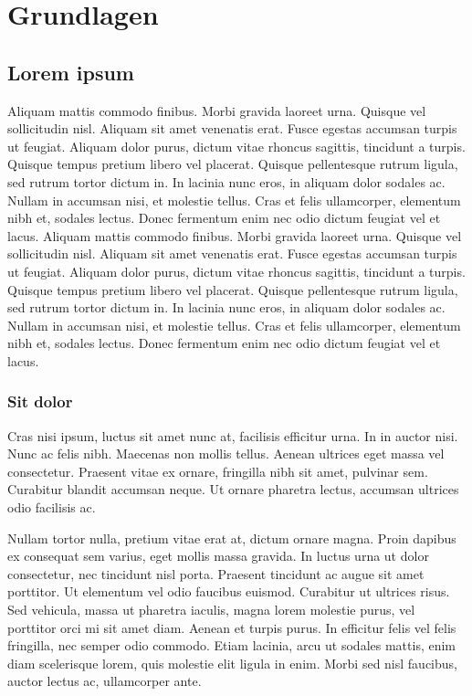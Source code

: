 \section{Grundlagen}

\subsection{Lorem ipsum}
Aliquam mattis commodo finibus. Morbi gravida laoreet urna. Quisque vel sollicitudin nisl. Aliquam sit amet venenatis erat. Fusce egestas accumsan turpis ut feugiat. Aliquam dolor purus, dictum vitae rhoncus sagittis, tincidunt a turpis. Quisque tempus pretium libero vel placerat. Quisque pellentesque rutrum ligula, sed rutrum tortor dictum in. In lacinia nunc eros, in aliquam dolor sodales ac. Nullam in accumsan nisi, et molestie tellus. Cras et felis ullamcorper, elementum nibh et, sodales lectus. Donec fermentum enim nec odio dictum feugiat vel et lacus. Aliquam mattis commodo finibus. Morbi gravida laoreet urna. Quisque vel sollicitudin nisl. Aliquam sit amet venenatis erat. Fusce egestas accumsan turpis ut feugiat. Aliquam dolor purus, dictum vitae rhoncus sagittis, tincidunt a turpis. Quisque tempus pretium libero vel placerat. Quisque pellentesque rutrum ligula, sed rutrum tortor dictum in. In lacinia nunc eros, in aliquam dolor sodales ac. Nullam in accumsan nisi, et molestie tellus. Cras et felis ullamcorper, elementum nibh et, sodales lectus. Donec fermentum enim nec odio dictum feugiat vel et lacus.

\subsubsection{Sit dolor}
Cras nisi ipsum, luctus sit amet nunc at, facilisis efficitur urna. In in auctor nisi. Nunc ac felis nibh. Maecenas non mollis tellus. Aenean ultrices eget massa vel consectetur. Praesent vitae ex ornare, fringilla nibh sit amet, pulvinar sem. Curabitur blandit accumsan neque. Ut ornare pharetra lectus, accumsan ultrices odio facilisis ac.\par
Nullam tortor nulla, pretium vitae erat at, dictum ornare magna. Proin dapibus ex consequat sem varius, eget mollis massa gravida. In luctus urna ut dolor consectetur, nec tincidunt nisl porta. Praesent tincidunt ac augue sit amet porttitor. Ut elementum vel odio faucibus euismod. Curabitur ut ultrices risus. Sed vehicula, massa ut pharetra iaculis, magna lorem molestie purus, vel porttitor orci mi sit amet diam. Aenean et turpis purus. In efficitur felis vel felis fringilla, nec semper odio commodo. Etiam lacinia, arcu ut sodales mattis, enim diam scelerisque lorem, quis molestie elit ligula in enim. Morbi sed nisl faucibus, auctor lectus ac, ullamcorper ante.